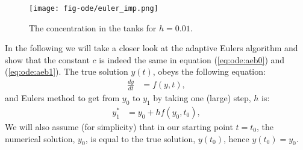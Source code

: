\documentclass[graybox,sectrefs,envcountresetchap,open=right,final]{svmonodo}
\makeatletter
\newenvironment{doconceexercise}{}{}
\newcounter{doconceexercisecounter}%
\newcommand\listofexercises{
\chapter*{List of Exercises
          \@mkboth{List of Exercises}{List of Exercises}}
\markboth{List of Exercises}{List of Exercises}
\@starttoc{loe}
}
\makeatother
\begin{document}
\begin{figure}[!ht]  %
  \centerline{\texttt{[image: fig-ode/euler\_imp.png]}}
  \caption{
  The concentration in the tanks for $h=0.01$.\label{fig:ode:euler_imp}
  }
\end{figure}


\begin{doconceexercise}

                             

In the following we will take a closer look at the adaptive Eulers algorithm and show that the 
constant $c$ is indeed the same in equation (\ref{eq:ode:aeb0}) and (\ref{eq:ode:aeb1}). 
The true solution $y(t)$, obeys the following equation:
\begin{align}
\frac{dy}{dt}&=f(y,t),\label{eq:ode:ay}
\end{align}
and Eulers method to get from $y_0$ to $y_1$ by taking one (large) step, $h$ is:
\begin{align}
y^*_1&=y_0+hf(y_0,t_0),\label{eq:ode:ae0}
\end{align}
We will also assume (for simplicity) that in our starting point $t=t_0$, the numerical solution, $y_0$, is equal to the true solution, $y(t_0)$, hence $y(t_0)=y_0$.


\end{doconceexercise}
\end{document}
